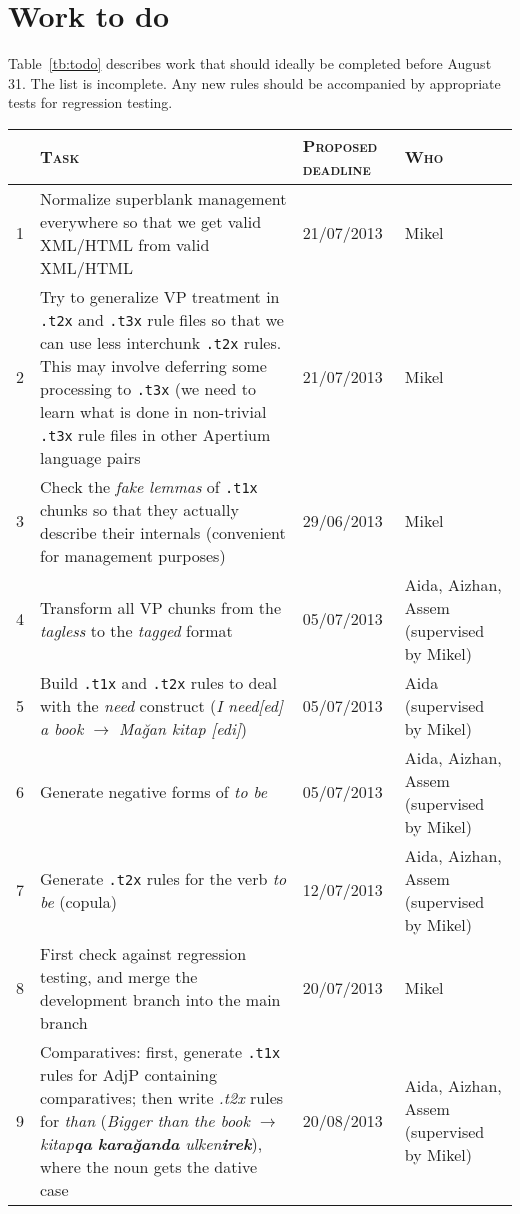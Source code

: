\documentclass{article}
\begin{document}
\section{Work to do}
\label{se:todo}
Table~\ref{tb:todo} describes work that should ideally be completed before August 31. The list is incomplete. Any new rules should be accompanied by appropriate tests for regression testing.
\begin{table}
  \centering
  \begin{tabular}{r|p{7.5cm}|p{1.7cm}|p{2.2cm}}
    \hline\hline
    \textsc{} & \textsc{Task} & \textsc{Proposed deadline} & \textsc{Who} \\
    \hline
    1 & Normalize superblank management everywhere so that we get valid XML/HTML from valid XML/HTML & 21/07/2013 & Mikel \\\hline
    2 & Try to generalize VP treatment in \texttt{.t2x} and \texttt{.t3x} rule files so that we can use less interchunk \texttt{.t2x} rules. This may involve deferring some processing to \texttt{.t3x} (we need to learn what is done in non-trivial \texttt{.t3x} rule files in other Apertium language pairs & 21/07/2013 & Mikel \\\hline
    3 & Check the \emph{fake lemmas} of \texttt{.t1x} chunks so that they actually describe their internals (convenient for management purposes) & 29/06/2013 & Mikel \\\hline
    4 & Transform all VP chunks from the \emph{tagless} to the \emph{tagged} format & 05/07/2013 & Aida, Aizhan, Assem (supervised by Mikel) \\\hline
    5 & Build \texttt{.t1x} and \texttt{.t2x} rules to deal with the \emph{need} construct (\emph{I need[ed] a book} \(\to\) \emph{Ma\u{g}an kitap [edi]}) & 05/07/2013 & Aida (supervised by Mikel) \\\hline
    6 & Generate negative forms of \emph{to be} & 05/07/2013 & Aida, Aizhan, Assem (supervised by Mikel) \\\hline
    7 & Generate \texttt{.t2x} rules for the verb \emph{to be} (copula) & 12/07/2013 & Aida, Aizhan, Assem (supervised by Mikel) \\\hline 
   8 & First check against regression testing, and merge the development branch into the main branch & 20/07/2013 & Mikel \\
   9 & Comparatives: first, generate \texttt{.t1x} rules for AdjP containing comparatives; then write \emph{.t2x} rules for \emph{than} (\emph{Bigger than the book} \(\to\) \emph{kitap\textbf{qa} \textbf{kara\u{g}anda} ulken\textbf{irek}}), where the noun gets the dative case & 20/08/2013 & Aida, Aizhan, Assem (supervised by Mikel) \\\hline

\end{tabular}
\end{table}
\end{document}
